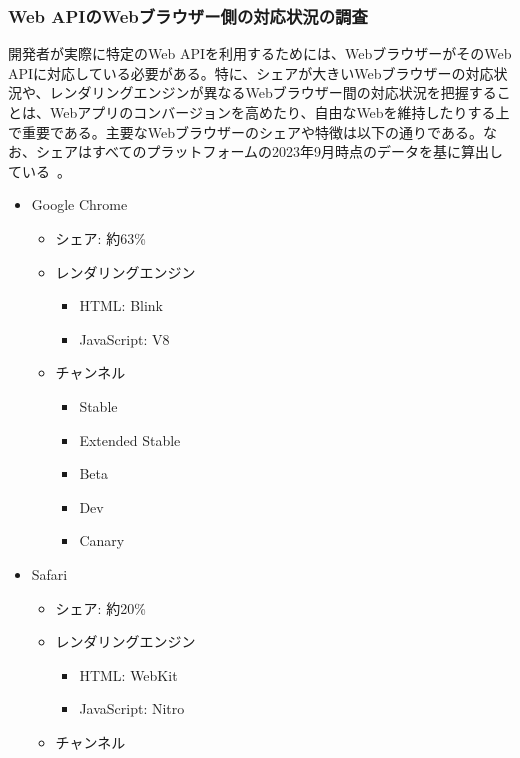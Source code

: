 \subsubsection{Web APIのWebブラウザー側の対応状況の調査}\label{subsubsection:Web APIのWebブラウザー側の対応状況の調査}
開発者が実際に特定のWeb APIを利用するためには、WebブラウザーがそのWeb APIに対応している必要がある。特に、シェアが大きいWebブラウザーの対応状況や、レンダリングエンジンが異なるWebブラウザー間の対応状況を把握することは、Webアプリのコンバージョンを高めたり、自由なWebを維持したりする上で重要である。主要なWebブラウザーのシェアや特徴は以下の通りである。なお、シェアはすべてのプラットフォームの2023年9月時点のデータを基に算出している~\cite{StatCounterBrowserMarketShare}。
\begin{itemize}
    \item Google Chrome
    \begin{itemize}
        \item シェア: 約63\%
        \item レンダリングエンジン
        \begin{itemize}
            \item HTML: Blink
            \item JavaScript: V8
        \end{itemize}
        \item チャンネル~\cite{GoogleChromeChannels}
        \begin{itemize}
            \item Stable
            \item Extended Stable
            \item Beta
            \item Dev
            \item Canary
        \end{itemize}
    \end{itemize}
    \item Safari
    \begin{itemize}
        \item シェア: 約20\%
        \item レンダリングエンジン
        \begin{itemize}
            \item HTML: WebKit
            \item JavaScript: Nitro
        \end{itemize}
        \item チャンネル~\cite{SafariChannels}
        \begin{itemize}

\end{itemize}
\end{itemize}
\end{itemize}
